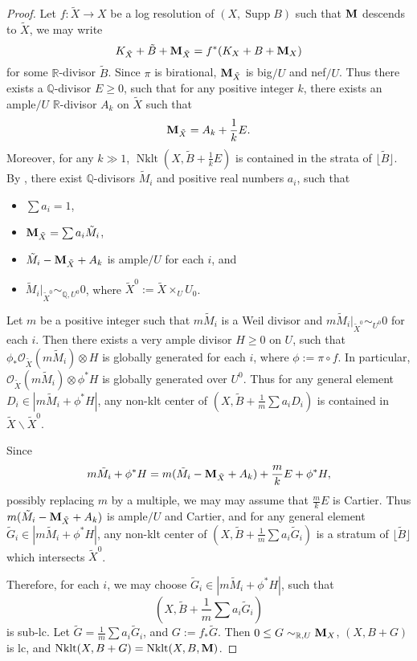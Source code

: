 \documentclass[11pt]{amsart}
\numberwithin{equation}{section}
\newcommand{\Mm}{{\bf{M}}}
\newcommand{\Qq}{\mathbb{Q}}
\newcommand{\Rr}{\mathbb{R}}
\newcommand{\Nklt}{\operatorname{Nklt}}
\newcommand{\Supp}{\operatorname{Supp}}
\theoremstyle{definition}
\theoremstyle{definition}
\theoremstyle{definition}
\begin{document}
\begin{proof}
Let $f:\tilde{X}\to X$ be a log resolution of $(X,\Supp B)$ such that $\Mm$ descends to $\tilde{X}$, we may write 
$$K_{\tilde{X}}+\tilde B+\Mm_{\tilde{X}}=f^*(K_X+B+\Mm_X)$$
for some $\Rr$-divisor $\tilde{B}$. Since 
$\pi$ is birational, $\Mm_{\tilde{X}}$ is big$/U$ and nef$/U$. Thus there exists a $\Qq$-divisor $E\ge 0$, such that for any positive integer $k$, there exists an ample$/U$ $\Rr$-divisor $A_k$ on $\tilde X$ such that
$$\Mm_{\tilde{X}}=A_k+\frac{1}{k}E.$$ 
Moreover, for any $k\gg 1$, $\Nklt(X,\tilde B+\frac{1}{k}E)$ is contained in the strata of $\lfloor \tilde B\rfloor$. By \cite[Lemma 5.3]{HLS19}, there exist $\Qq$-divisors $\tilde{M}_i$ and positive real numbers $a_i$, such that 
\begin{itemize}
\item $\sum a_i=1$,
    \item $\Mm_{\tilde{X}}=\sum a_i\tilde{M}_i$,
    \item $\tilde{M}_i-\Mm_{\tilde{X}}+A_k$ is ample$/U$ for each $i$, and
    \item $\tilde{M}_i|_{\tilde{X}^0}\sim_{\Qq,U^0}0$, where $\tilde{X}^0:=\tilde{X}\times_{U}U_0$.
\end{itemize}
Let $m$ be a positive integer such that $m\tilde{M}_i$ is a Weil divisor and $m\tilde{M}_i|_{\tilde{X}^0}\sim_{U^0}0$ for each $i$. Then there exists a very ample divisor $H\ge 0$ on $U$, such that $\phi_{*}\mathcal{O}_{\tilde{X}}(m\tilde{M}_i)\otimes H$ is globally generated for each $i$, where $\phi:=\pi\circ f$. In particular, $\mathcal{O}_{\tilde{X}}(m\tilde{M}_i)\otimes \phi^{*}H$ is globally generated over $U^0$. Thus for any general element $D_i\in |m\tilde{M}_i+\phi^{*}H|$, any non-klt center of $(X,\tilde B+\frac{1}{m}\sum a_iD_i)$ is contained in $\tilde{X}\backslash \tilde{X}^0$. 

Since 
$$m\tilde{M}_i+\phi^{*}H=m(\tilde{M}_i-\Mm_{\tilde{X}}+A_k)+\frac{m}{k}E+\phi^{*}H,$$ possibly replacing $m$ by a multiple, we may
may assume that $\frac{m}{k}E$ is Cartier. Thus $m(\tilde{M}_i-\Mm_{\tilde{X}}+A_k)$ is ample$/U$ and Cartier, and for any general element $\tilde{G}_i\in |m\tilde{M}_i+\phi^{*}H|$, any non-klt center of  $(X,\tilde B+\frac{1}{m}\sum a_i\tilde{G}_i)$ is a stratum of $\lfloor\tilde B\rfloor$ which intersects $\tilde{X}^0$. 


Therefore, for each $i$, we may choose $\tilde{G}_i\in |m\tilde{M}_i+\phi^{*}H|$, such that 
$$\left(X,\tilde B+\frac{1}{m}\sum a_i\tilde{G}_i\right)$$ is sub-lc. Let $\tilde{G}=\frac{1}{m}\sum a_i\tilde{G}_i$, and $G:=f_*\tilde{G}$. Then $0\leq G\sim _{\Rr,U}\Mm _X$, $(X,B+G)$ is lc, and $\Nklt(X,B+G)=\Nklt(X,B,\Mm)$.
\end{proof}
\end{document}
